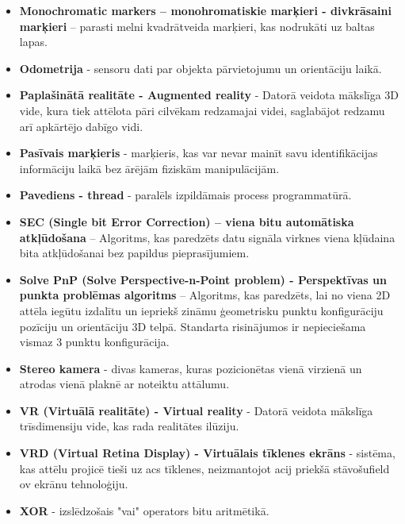 \documentclass[12pt, a4paper, oneside, openright]{article}
\begin{document}
\begin{itemize}
\item \textbf{Monochromatic markers – monohromatiskie marķieri - divkrāsaini marķieri} – parasti melni kvadrātveida
marķieri, kas nodrukāti uz baltas lapas.

\item \textbf{Odometrija} - sensoru dati par objekta pārvietojumu un orientāciju laikā.

\item \textbf{Paplašinātā realitāte - Augmented reality} - Datorā veidota mākslīga 3D vide, kura tiek attēlota pāri cilvēkam redzamajai videi, saglabājot redzamu arī apkārtējo dabīgo vidi. 

\item \textbf{Pasīvais marķieris} - marķieris, kas var nevar mainīt savu identifikācijas informāciju laikā bez ārējām fiziskām manipulācijām.

\item \textbf{Pavediens - thread} - paralēls izpildāmais process programmatūrā.

\item \textbf{SEC (Single bit Error Correction) – viena bitu automātiska atkļūdošana} – 
Algoritms, kas paredzēts datu signāla virknes viena kļūdaina bita atkļūdošanai bez papildus pieprasījumiem.

\item \textbf{Solve PnP (Solve Perspective-n-Point problem) - Perspektīvas un punkta problēmas algoritms} – Algoritms, kas
paredzēts, lai no viena 2D attēla iegūtu izdalītu un iepriekš zināmu ģeometrisku punktu konfigurāciju pozīciju un orientāciju
3D telpā. Standarta risinājumos ir nepieciešama vismaz 3 punktu konfigurācija.

\item \textbf{Stereo kamera} - divas kameras, kuras pozicionētas vienā virzienā un atrodas vienā plaknē ar noteiktu attālumu.

\item \textbf{VR (Virtuālā realitāte) - Virtual reality} - Datorā veidota mākslīga trīsdimensiju vide, kas rada realitātes ilūziju.

\item \textbf{VRD (Virtual Retina Display) - Virtuālais tīklenes ekrāns} - sistēma, kas attēlu projicē tieši uz acs tīklenes, neizmantojot acij priekšā stāvošufield ov ekrānu tehnoloģiju.

\item \textbf{XOR} - izslēdzošais "vai" operators bitu aritmētikā.

\end{itemize}




\newpage
\nocite{*} %
\renewcommand{\refname}{8. Izmantotā literatūra}


\end{document}
